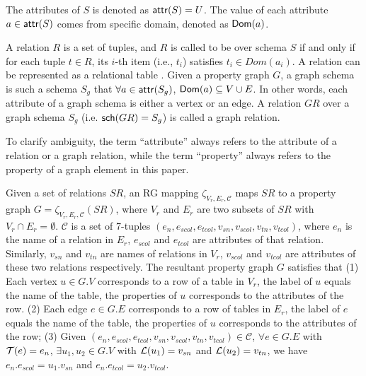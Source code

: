The attributes of $S$ is denoted as ${\mathsf{attr}}(S) = U$. The value of each attribute $a \in {\ensuremath {\mathsf{attr}}}(S)$ comes from specific domain, denoted as ${\mathsf{Dom}}(a)$.

A relation $R$ is a set of tuples, and $R$ is called to be over schema $S$ if and only if for each tuple $t \in R$, its $i$-th item (i.e., $t_i$) satisfies $t_i \in Dom(a_i)$.
A relation can be represented as a relational table \cite{relation-as-table}.
Given a property graph $G$, a graph schema is such a schema $S_g$ that $\forall a \in {\ensuremath {\mathsf{attr}}}(S_g)$, ${\mathsf{Dom}}(a) \subseteq V \cup E$.
In other words, each attribute of a graph schema is either a vertex or an edge.
A relation $GR$ over a graph schema $S_g$ (i.e. ${\mathsf{sch}}(GR) = S_g$) is called a graph relation.

To clarify ambiguity, the term ``attribute'' always refers to the attribute of a relation or a graph relation, while the term ``property'' always refers to the property of a graph element in this paper.

\begin{definition}
    Given a set of relations $SR$, an RG mapping $\zeta_{V_r, E_r, \mathcal{C}}$ maps $SR$ to a property graph $G = \zeta_{V_r, E_r, \mathcal{C}}(SR)$, where $V_r$ and $E_r$ are two subsets of $SR$ with $V_r \cap E_r = \emptyset$.
    $\mathcal{C}$ is a set of 7-tuples $(e_n, e_{scol}, e_{tcol}, v_{sn}, v_{scol}, v_{tn}, v_{tcol})$, where $e_n$ is the name of a relation in $E_r$, $e_{scol}$ and $e_{tcol}$ are attributes of that relation.
    Similarly, $v_{sn}$ and $v_{tn}$ are names of relations in $V_r$, $v_{scol}$ and $v_{tcol}$ are attributes of these two relations respectively.
    The resultant property graph $G$ satisfies that
    (1) Each vertex $u \in G.V$ corresponds to a row of a table in $V_r$, the label of $u$ equals the name of the table, the properties of $u$ corresponds to the attributes of the row.
    (2) Each edge $e \in G.E$ corresponds to a row of tables in $E_r$, the label of $e$ equals the name of the table, the properties of $u$ corresponds to the attributes of the row;
    (3) Given $(e_n, e_{scol}, e_{tcol}, v_{sn}, v_{scol}, v_{tn}, v_{tcol}) \in \mathcal{C}$, $\forall e \in G.E$ with $\mathcal{T}(e) = e_n$, $\exists u_1, u_2 \in G.V$ with $\mathcal{L}(u_1) = v_{sn}$ and $\mathcal{L}(u_2) = v_{tn}$, we have $e_n.e_{scol} = u_1.v_{sn}$ and $e_n.e_{tcol} = u_2.v_{tcol}$.
\end{definition}

